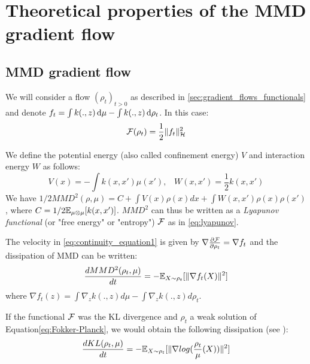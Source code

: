 \section{Theoretical properties of the MMD gradient flow}\label{sec:mmd_flow}

\subsection{MMD gradient flow}

We will consider a flow $(\rho_t)_{t>0}$ as described in \cref{sec:gradient_flows_functionals} and denote $f_t= \int k(.,z)\mathop{}\!\mathrm{d} \mu - \int k(.,z)\mathop{}\!\mathrm{d} \rho_t$. In this case:
\begin{equation}
{{\mathcal F}}(\rho_t)=\frac{1}{2}\|f_t\|^2_{{{\mathcal H}}}
\end{equation} 

We define the potential energy (also called confinement energy) $V$ and interaction energy $W$ as follows:
\begin{equation}
V(x)=-\int  k(x,x')\mu(x')\text{,} \quad
W(x,x')=\frac{1}{2}k(x,x')
\end{equation}
We have $1/2MMD^2(\rho,\mu)=C+ \int V(x) \rho(x)dx + \int W(x,x')\rho(x)\rho(x')$, where $C=1/2{{\mathbb E}}_{\mu\otimes \mu}[k(x,x')]$. $MMD^2$ can thus be written as a \textit{Lyapunov functional} (or "free energy" or "entropy") ${{\mathcal F}}$ as in \eqref{eq:lyapunov}.



\begin{proposition}\label{prop:mmd_flow}
 The velocity in \eqref{eq:continuity_equation1} is given by $\nabla \frac{\partial{{{\mathcal F}}}}{\partial{\rho_t}}=\nabla f_t$ and the dissipation of MMD can be written:  
	\begin{equation}
	\frac{d MMD^2(\rho_t, \mu)}{dt}=-{{\mathbb E}}_{X \sim \rho_t}[\|\nabla f_t(X)\|^2]
	\end{equation}
	where $\nabla f_t(z)= \int \nabla_{z}k(.,z) d\mu -  \int \nabla_{z}k(.,z) d\rho_t$.
\end{proposition}

\begin{remark}
	If the functional ${{\mathcal F}}$ was the KL divergence and $\rho_t$ a weak solution of Equation\eqref{eq:Fokker-Planck}, we would obtain the following dissipation (see \cite{wibisono2018sampling}):
	\begin{equation}
	\frac{d KL(\rho_t, \mu)}{dt}=-{{\mathbb E}}_{X \sim \rho_t}[\|\nabla log(\frac{\rho_t}{\mu}(X))\|^2]
	\end{equation}
\end{remark}


